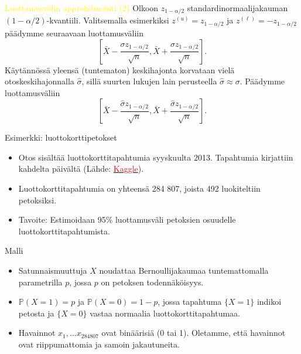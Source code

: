 \documentclass{beamer}
\begin{document}

\begin{frame}{\textcolor{yellow}{Luottamusvälin approksimointi (2)}}
  Olkoon $z_{1-\alpha/2}$ standardinormaalijakauman $(1-\alpha/2)$-kvantiili.
  Valitsemalla esimerkiksi $z^{(u)} = z_{1 - \alpha/2}$ ja $z^{(\ell)} = -z_{1 -
  \alpha/2}$ päädymme seuraavaan luottamusväliin
  \begin{equation*}
    \left[\bar X - \frac{\sigma z_{1 - \alpha/2}}{\sqrt{n}},
    \bar X + \frac{\sigma z_{1 - \alpha/2}}{\sqrt{n}}\right].
  \end{equation*}
  \pause
  Käytännössä yleensä (tuntematon) keskihajonta korvataan vielä
  otoskeskihajonnalla $\hat\sigma$, sillä suurten lukujen lain perusteella
  $\hat\sigma\approx\sigma$. Päädymme luottamusväliin
  \begin{equation*}
    \left[\bar X - \frac{\hat\sigma z_{1 - \alpha/2}}{\sqrt{n}},
    \bar X + \frac{\hat\sigma z_{1 - \alpha/2}}{\sqrt{n}}\right].
  \end{equation*}
\end{frame}


\begin{frame}{Esimerkki: luottokorttipetokset}
  \begin{itemize}
    \item Otos sisältää luottokorttitapahtumia syyskuulta 2013. Tapahtumia
    kirjattiin kahdelta päivältä
    (Lähde: \href{https://www.kaggle.com/datasets/mlg-ulb/creditcardfraud?resource=download}{\textcolor{red}{Kaggle}}).
    \pause
    \item Luottokorttitapahtumia on yhteensä 284 807, joista 492 luokiteltiin
    petoksiksi.
    \pause
    \item Tavoite: Estimoidaan 95\% luottamusväli petoksien osuudelle
    luottokorttitapahtumista.
  \end{itemize}
\end{frame}


\begin{frame}{Malli}
  \begin{itemize}
    \item Satunnaismuuttuja $X$ noudattaa Bernoullijakaumaa tuntemattomalla
    parametrilla $p$, jossa $p$ on petoksen todennäköisyys.
    \item $\mathbb{P}\left(X = 1\right) = p$ ja $\mathbb{P}\left(X = 0\right) =
    1 - p$, jossa tapahtuma $\{X = 1\}$ indikoi petosta ja $\{X = 0\}$ vastaa
    normaalia luottokorttitapahtumaa.
    \item Havainnot $x_1, \ldots x_{284807}$ ovat binäärisiä (0 tai 1).
    Oletamme, että havainnot ovat riippumattomia ja samoin jakautuneita.
  \end{itemize}
\end{frame}
\end{document}
